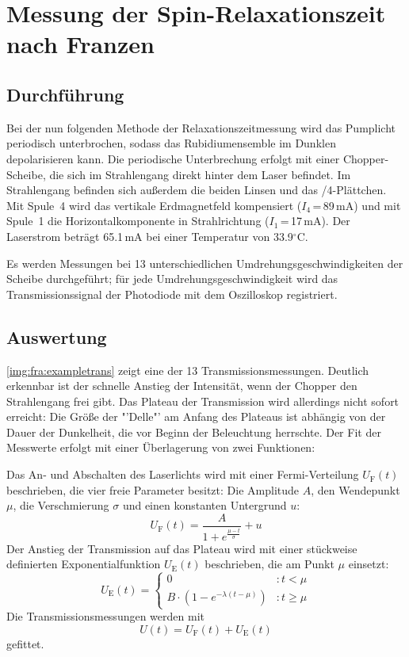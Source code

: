 \section{Messung der Spin-Relaxationszeit nach Franzen}
\subsection{Durchführung}
Bei der nun folgenden Methode der Relaxationszeitmessung wird das Pumplicht periodisch unterbrochen,
sodass das Rubidiumensemble im Dunklen depolarisieren kann.
Die periodische Unterbrechung erfolgt mit einer Chopper-Scheibe,
die sich im Strahlengang direkt hinter dem Laser befindet.
Im Strahlengang befinden sich außerdem die beiden Linsen und das \textlambda/4-Plättchen.
Mit Spule~4 wird das vertikale Erdmagnetfeld kompensiert ($I_4$\,=\,89\,mA) und mit Spule~1 die
Horizontalkomponente in Strahlrichtung ($I_1$\,=\,17\,mA).
Der Laserstrom beträgt 65.1\,mA bei einer Temperatur von 33.9$^\circ$C.

Es werden Messungen bei 13 unterschiedlichen Umdrehungsgeschwindigkeiten der Scheibe durchgeführt;
für jede Umdrehungsgeschwindigkeit wird das Transmissionssignal der Photodiode mit dem Oszilloskop registriert.


\subsection{Auswertung}

\autoref{img:fra:exampletrans} zeigt eine der 13 Transmissionsmessungen.
Deutlich erkennbar ist der schnelle Anstieg der Intensität, wenn der Chopper den Strahlengang frei gibt.
Das Plateau der Transmission wird allerdings nicht sofort erreicht:
Die Größe der "'Delle"' am Anfang des Plateaus ist abhängig von der Dauer der Dunkelheit,
die vor Beginn der Beleuchtung herrschte.
Der Fit der Messwerte erfolgt mit einer Überlagerung von zwei Funktionen:

Das An- und Abschalten des Laserlichts wird mit einer Fermi-Verteilung $U_{\text{F}}(t)$ beschrieben,
die vier freie Parameter besitzt:
Die Amplitude $A$, den Wendepunkt $\mu$, die Verschmierung $\sigma$ und einen konstanten Untergrund $u$:
\begin{equation}
  U_{\text{F}}(t)=\frac{A}{1+e^{\frac{\mu - t}{\sigma}}} + u
\end{equation}
Der Anstieg der Transmission auf das Plateau wird mit einer stückweise definierten Exponentialfunktion $U_{\text{E}}(t)$
beschrieben, die am Punkt $\mu$ einsetzt:
\begin{equation}
  U_{\text{E}}(t)= \left\{
  \begin{array}{lr}
    0 & : t < \mu\\
    B \cdot (1-e^{-\lambda(t-\mu)}) & : t \geq \mu
  \end{array}
\right.
\end{equation}
Die Transmissionsmessungen werden mit
\begin{equation}
   U(t)= U_{\text{F}}(t)+ U_{\text{E}}(t)
\end{equation}
gefittet.

